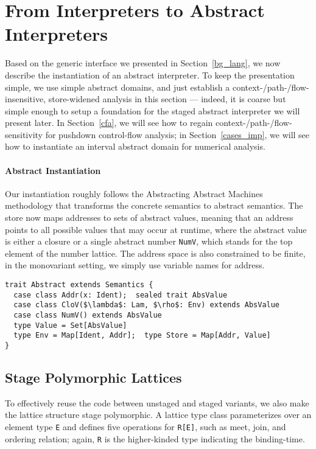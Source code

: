 \section{From Interpreters to Abstract Interpreters} \label{unstaged_abs}

Based on the generic interface we presented in Section~\ref{bg_lang}, we now
describe the instantiation of an abstract interpreter. To keep the presentation
simple, we use simple abstract domains, and just establish a
context-/path-/flow-insensitive, store-widened analysis in this section ---
indeed, it is coarse but simple enough to setup a foundation for the staged
abstract interpreter we will present later. In Section~\ref{cfa}, we will see
how to regain context-/path-/flow-sensitivity  for pushdown
control-flow analysis; in Section~\ref{cases_imp}, we will see how to
instantiate an interval abstract domain for numerical analysis.

\paragraph{Abstract Instantiation}

Our instantiation roughly follows the Abstracting Abstract Machines methodology
\cite{DBLP:conf/icfp/HornM10, DBLP:journals/jfp/HornM12} that transforms the
concrete semantics to abstract semantics. The store now maps addresses to sets
of abstract values, meaning that an address points to all possible values that
may occur at runtime, where the abstract value is either a closure or a single
abstract number \texttt{NumV}, which stands for the top element of the number
lattice. The address space is also constrained to be finite, in the monovariant
setting, we simply use variable names for address.

\begin{lstlisting}
trait Abstract extends Semantics {
  case class Addr(x: Ident);  sealed trait AbsValue
  case class CloV($\lambda$: Lam, $\rho$: Env) extends AbsValue
  case class NumV() extends AbsValue
  type Value = Set[AbsValue]
  type Env = Map[Ident, Addr];  type Store = Map[Addr, Value]
}
\end{lstlisting}

\subsection{Stage Polymorphic Lattices} \label{stagedpoly_lat}

To effectively reuse the code between unstaged and staged variants, we also make
the lattice structure stage polymorphic. A lattice type class parameterizes over
an element type \texttt{E} and defines five operations for \texttt{R[E]}, such
as meet, join, and ordering relation; again, \texttt{R} is the higher-kinded
type indicating the binding-time.


